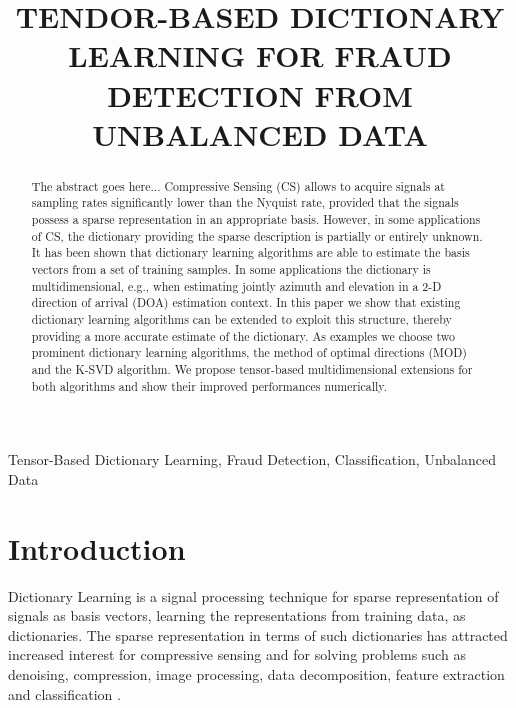 \documentclass{article}
\title{TENDOR-BASED DICTIONARY LEARNING FOR FRAUD DETECTION FROM UNBALANCED DATA}
\begin{document}
%
\maketitle

\begin{abstract}
The abstract goes here... Compressive Sensing (CS) allows to acquire signals at sampling rates significantly lower than the Nyquist rate, provided that the signals possess a sparse representation in an appropriate basis. However, in some applications of CS, the dictionary providing the sparse description is partially or entirely unknown. It has been shown that dictionary learning algorithms are able to estimate the basis vectors from a set of training samples. In some applications the dictionary is multidimensional, e.g., when estimating jointly azimuth and elevation in a 2-D direction of arrival (DOA) estimation context. In this paper we show that existing dictionary learning algorithms can be extended to exploit this structure, thereby providing a more accurate estimate of the dictionary. As examples we choose two prominent dictionary learning algorithms, the method of optimal directions (MOD) and the K-SVD algorithm. We propose tensor-based multidimensional extensions for both algorithms and show their improved performances numerically.
\end{abstract}

\begin{keywords}
Tensor-Based Dictionary Learning, Fraud Detection, Classification, Unbalanced Data
\end{keywords}

\section{Introduction}
\label{sec:introduction}
Dictionary Learning is a signal processing technique for sparse representation of signals as basis vectors, learning the representations from training data, as dictionaries. The sparse representation in terms of such dictionaries has attracted increased interest for compressive sensing and for solving problems such as denoising, compression, image processing, data decomposition, feature extraction and classification \cite{tosic2011dictionary, zhang2010discriminative, zhu2016coupled,ravishankar2011mr}.
\end{document}
